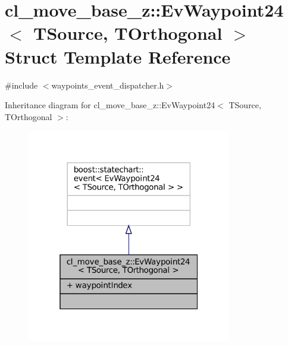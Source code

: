 \hypertarget{structcl__move__base__z_1_1EvWaypoint24}{}\section{cl\+\_\+move\+\_\+base\+\_\+z\+:\+:Ev\+Waypoint24$<$ T\+Source, T\+Orthogonal $>$ Struct Template Reference}
\label{structcl__move__base__z_1_1EvWaypoint24}


{\ttfamily \#include $<$waypoints\+\_\+event\+\_\+dispatcher.\+h$>$}



Inheritance diagram for cl\+\_\+move\+\_\+base\+\_\+z\+:\+:Ev\+Waypoint24$<$ T\+Source, T\+Orthogonal $>$\+:
\nopagebreak
\begin{figure}[H]
\begin{center}
\leavevmode
\includegraphics[width=253pt]{structcl__move__base__z_1_1EvWaypoint24__inherit__graph}
\end{center}
\end{figure}


